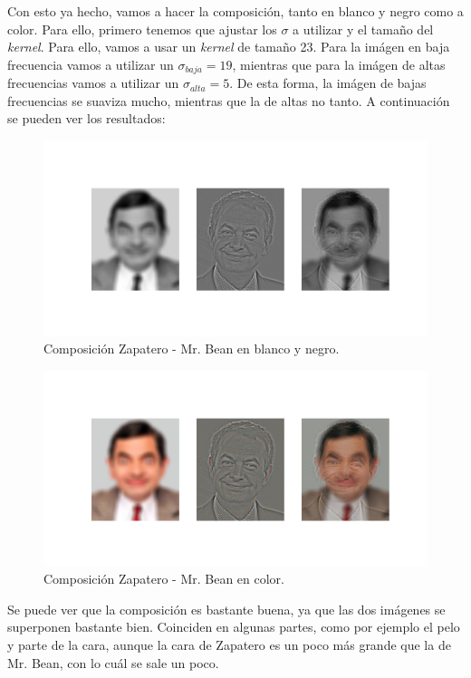 \documentclass[11pt,a4paper]{article}
\begin{document}
Con esto ya hecho, vamos a hacer la composición, tanto en blanco y negro como a color. Para ello, primero tenemos que ajustar
los $\sigma$ a utilizar y el tamaño del \textit{kernel}. Para ello, vamos a usar un \textit{kernel} de tamaño 23. Para la imágen
en baja frecuencia vamos a utilizar un $\sigma_{baja} = 19$, mientras que para la imágen de altas frecuencias vamos a utilizar
un $\sigma_{alta} = 5$. De esta forma, la imágen de bajas frecuencias se suaviza mucho, mientras que la de altas no tanto. A
continuación se pueden ver los resultados:

\begin{figure}[H]
\centering
\includegraphics[scale=0.3]{img/zapabean1.png}
\caption{Composición Zapatero - Mr. Bean en blanco y negro.}
\label{fig:zapabean-wb}
\end{figure}

\begin{figure}[H]
\centering
\includegraphics[scale=0.3]{img/zapabean2.png}
\caption{Composición Zapatero - Mr. Bean en color.}
\label{fig:zapabean-color}
\end{figure}

Se puede ver que la composición es bastante buena, ya que las dos imágenes se superponen bastante bien. Coinciden en algunas partes,
como por ejemplo el pelo y parte de la cara, aunque la cara de Zapatero es un poco más grande que la de Mr. Bean, con lo cuál
se sale un poco.
\end{document}
